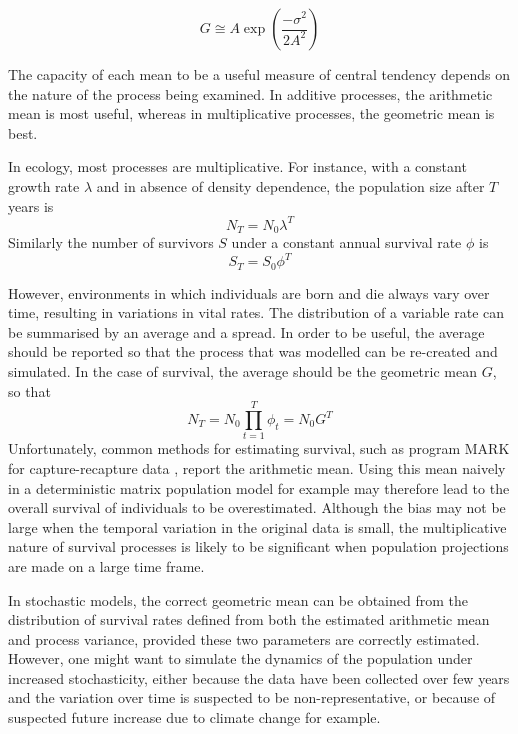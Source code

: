 \documentclass[preprint,authoryear,12pt]{elsarticle}
\begin{document}
\[ G \cong A \exp \left(\frac{-\sigma^2}{2 A^2} \right) \]

The capacity of each mean to be a useful measure of central tendency
depends on the nature of the process being examined. In additive
processes, the arithmetic mean is most useful, whereas in
multiplicative processes, the geometric mean is best.

In ecology, most processes are multiplicative. For instance, with a
constant growth rate $\lambda$ and in absence of density dependence,
the population size after $T$ years is
\[ N_{T} = N_{0} \lambda^T \]
Similarly the number of survivors $S$ under a constant annual survival
rate $\phi$ is \[ S_{T} = S_{0} \phi^T \]

However, environments in which individuals are born and die always
vary over time, resulting in variations in vital rates. The
distribution of a variable rate can be summarised by an average and a
spread. In order to be useful, the average should be reported so that
the process that was modelled can be re-created and simulated. In the
case of survival, the average should be the geometric mean $G$, so
that
\[ N_{T} = N_{0} \prod_{t=1}^{T} \phi_{t} = N_{0} G^T \]
Unfortunately, common methods for estimating survival, such as program
MARK for capture-recapture data \citep{white_program_1999}, report the
arithmetic mean. Using this mean naively in a deterministic matrix
population model for example may therefore lead to the overall
survival of individuals to be overestimated. Although the bias may not
be large when the temporal variation in the original data is small,
the multiplicative nature of survival processes is likely to be
significant when population projections are made on a large time
frame.


In stochastic models, the correct geometric mean can be obtained from
the distribution of survival rates defined from both the estimated
arithmetic mean and process variance, provided these two parameters
are correctly estimated. However, one might want to simulate the
dynamics of the population under increased stochasticity, either
because the data have been collected over few years and the variation
over time is suspected to be non-representative, or because of
suspected future increase due to climate change for example.
\end{document}
